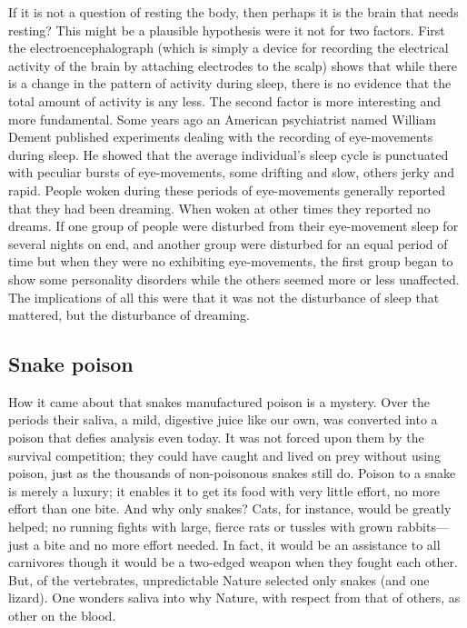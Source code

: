 \documentclass[11pt]{article}
\begin{document}
If it is not a question of resting the body, then perhaps it is the brain that needs resting? This might be a plausible hypothesis were it not for two factors. First the electroencephalograph (which is simply a device for recording the electrical activity of the brain by attaching electrodes to the scalp) shows that while there is a change in the pattern of activity during sleep, there is no evidence that the total amount of activity is any less. The second factor is more interesting and more fundamental. Some years ago an American psychiatrist named William Dement published experiments dealing with the recording of eye-movements during sleep. He showed that the average individual's sleep cycle is punctuated with peculiar bursts of eye-movements, some drifting and slow, others jerky and rapid. People woken during these periods of eye-movements generally reported that they had been dreaming. When woken at other times they reported no dreams. If one group of people were disturbed from their eye-movement sleep for several nights on end, and another group were disturbed for an equal period of time but when they were no exhibiting eye-movements, the first group began to show some personality disorders while the others seemed more or less unaffected. The implications of all this were that it was not the disturbance of sleep that mattered, but the disturbance of dreaming.
\subsection{Snake poison}
\label{sec-2-20}

How it came about that snakes manufactured poison is a mystery. Over the periods their saliva, a mild, digestive juice like our own, was converted into a poison that defies analysis even today. It was not forced upon them by the survival competition; they could have caught and lived on prey without using poison, just as the thousands of non-poisonous snakes still do. Poison to a snake is merely a luxury; it enables it to get its food with very little effort, no more effort than one bite. And why only snakes? Cats, for instance, would be greatly helped; no running fights with large, fierce rats or tussles with grown rabbits---just a bite and no more effort needed. In fact, it would be an assistance to all carnivores though it would be a two-edged weapon when they fought each other. But, of the vertebrates, unpredictable Nature selected only snakes (and one lizard). One wonders saliva into why Nature, with respect from that of others, as other on the blood.
\end{document}
